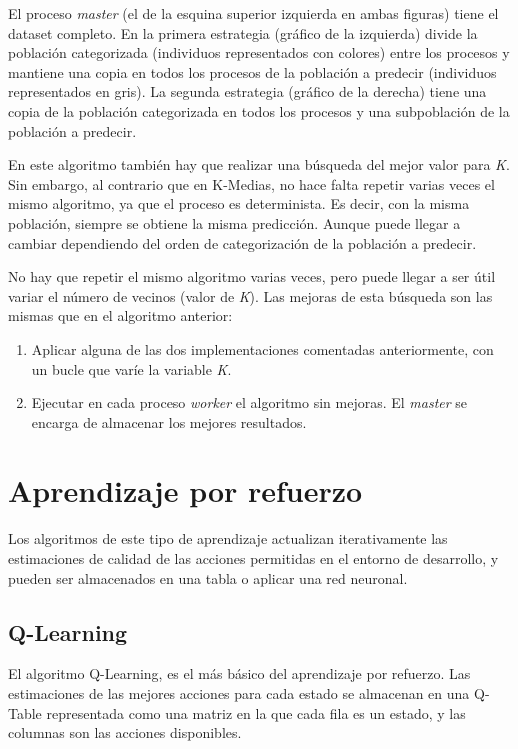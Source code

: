 		El proceso \textit{master} (el de la esquina superior izquierda en ambas figuras) tiene el dataset completo. En la primera estrategia (gráfico de la izquierda) divide la población categorizada (individuos representados con colores) entre los procesos y mantiene una copia en todos los procesos de la población a predecir (individuos representados en gris). La segunda estrategia (gráfico de la derecha) tiene una copia de la población categorizada en todos los procesos y una subpoblación de la población a predecir.
		
		
		En este algoritmo también hay que realizar una búsqueda del mejor valor para \textit{K}. Sin embargo, al contrario que en K-Medias, no hace falta repetir varias veces el mismo algoritmo, ya que el proceso es determinista. Es decir, con la misma población, siempre se obtiene la misma predicción. Aunque puede llegar a cambiar dependiendo del orden de categorización de la población a predecir. 
		
		No hay que repetir el mismo algoritmo varias veces, pero puede llegar a ser útil variar el número de vecinos (valor de \textit{K}). Las mejoras de esta búsqueda son las mismas que en el algoritmo anterior: 
		
		\begin{enumerate}
			\item Aplicar alguna de las dos implementaciones comentadas anteriormente, con un bucle que varíe la variable \textit{K}. 
			\item Ejecutar en cada proceso \textit{worker} el algoritmo sin mejoras. El \textit{master} se encarga de almacenar los mejores resultados.
		\end{enumerate}
		
		


\section{Aprendizaje por refuerzo}
	\label{cap:3_3}
	Los algoritmos de este tipo de aprendizaje actualizan iterativamente las estimaciones de calidad de las acciones permitidas en el entorno de desarrollo, y pueden ser almacenados en una tabla o aplicar una red neuronal.
	
	\subsection{Q-Learning}
	\label{cap:3_3_1}
		El algoritmo Q-Learning, es el más básico del aprendizaje por refuerzo. Las estimaciones de las mejores acciones para cada estado se almacenan en una Q-Table representada como una matriz en la que cada fila es un estado, y las columnas son las acciones disponibles. 
		

